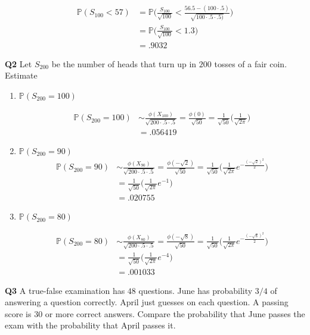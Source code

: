 \documentclass[12pt]{article}
\begin{document}
\begin{align*}
\mathbb{P}(S_{100} < 57) &= \mathbb{P}\Bigg ( \frac{S_{100}}{\sqrt{100}} < \frac{56.5 - (100 \cdot .5)}{\sqrt{100 \cdot .5 \cdot .5)}} \Bigg ) \\
&= \mathbb{P}\Bigg ( \frac{S_{100}}{\sqrt{100}} < 1.3 \Bigg ) \\
&= .9032 
\end{align*}

\noindent
\textbf{Q2} Let $S_{200}$ be the number of heads that turn up in $200$ tosses of a fair coin. Estimate

\begin{enumerate}[label=(\alph*)]
\item $\mathbb{P}(S_{200} = 100)$

\begin{align*}
\mathbb{P}(S_{200} = 100) &\sim \frac{\phi(X_{100})}{\sqrt{200 \cdot .5 \cdot .5}} = \frac{\phi(0)}{\sqrt{50}} = \frac{1}{\sqrt{50}} \Bigg ( \frac{1}{\sqrt{2 \pi}}\Bigg )\\
&= .056419
\end{align*}

\item $\mathbb{P}(S_{200} = 90)$
\begin{align*}
\mathbb{P}(S_{200} = 90) &\sim \frac{\phi(X_{90})}{\sqrt{200 \cdot .5 \cdot .5}} = \frac{\phi(- \sqrt{2})}{\sqrt{50}} = \frac{1}{\sqrt{50}} \Bigg ( \frac{1}{\sqrt{2 \pi}} e^{- \frac{(-\sqrt{2})^2}{2}} \Bigg )\\
&= \frac{1}{\sqrt{50}} \Bigg ( \frac{1}{\sqrt{2 \pi}} e^{-1} \Bigg ) \\
&= .020755
\end{align*}

\item $\mathbb{P}(S_{200} = 80)$

\begin{align*}
\mathbb{P}(S_{200} = 80) &\sim \frac{\phi(X_{80})}{\sqrt{200 \cdot .5 \cdot .5}} = \frac{\phi(- \sqrt{8})}{\sqrt{50}} = \frac{1}{\sqrt{50}} \Bigg ( \frac{1}{\sqrt{2 \pi}} e^{- \frac{(-\sqrt{8})^2}{2}} \Bigg )\\
&= \frac{1}{\sqrt{50}} \Bigg ( \frac{1}{\sqrt{2 \pi}} e^{-4} \Bigg ) \\
&= .001033
\end{align*}
\end{enumerate}

\noindent
\textbf{Q3} A true-false examination has $48$ questions. June has probability $3/4$ of answering a question correctly. April just guesses on each question. A passing score is $30$ or more correct answers. Compare the probability that June passes the exam with the probability that April passes it.
\end{document}
